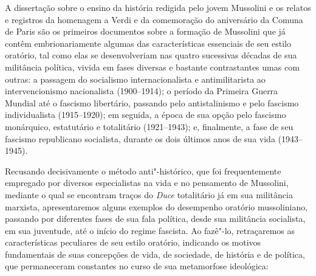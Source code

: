 A dissertação sobre o ensino da história redigida pelo jovem Mussolini e
os relatos e registros da homenagem a Verdi e da comemoração do
aniversário da Comuna de Paris são os primeiros documentos sobre a
formação de Mussolini que já contêm embrionariamente algumas das
características essenciais de seu estilo oratório, tal como elas se
desenvolveriam nas quatro sucessivas décadas de sua militância política,
vivida em fases diversas e bastante contrastantes umas com outras: a
passagem do socialismo internacionalista e antimilitarista ao
intervencionismo nacionalista (1900--1914); o período da Primeira Guerra
Mundial até o fascismo libertário, passando pelo antistalinismo e pelo
fascismo individualista (1915--1920); em seguida, a época de sua opção
pelo fascismo monárquico, estatutário e totalitário (1921--1943); e,
finalmente, a fase de seu fascismo republicano socialista, durante os
dois últimos anos de sua vida (1943--1945).

Recusando decisivamente o método anti"-histórico, que foi frequentemente
empregado por diversos especialistas na vida e no pensamento de
Mussolini, mediante o qual se encontram traços do \emph{Duce}
totalitário já em sua militância marxista, apresentaremos alguns
exemplos do desempenho oratório mussoliniano, passando por diferentes
fases de sua fala política, desde sua militância socialista, em sua
juventude, até o início do regime fascista. Ao fazê"-lo, retraçaremos as
características peculiares de seu estilo oratório, indicando os motivos
fundamentais de suas concepções de vida, de sociedade, de história e de
política, que permaneceram constantes no curso de sua metamorfose
ideológica:

